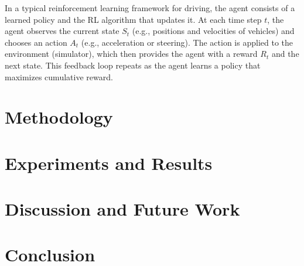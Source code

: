 \documentclass[12pt,a4paper]{article}
\begin{document}
In a typical reinforcement learning framework for driving, the agent consists of a learned policy and the RL algorithm that updates it. At each time step $t$, the agent observes the current state $S_t$ (e.g., positions and velocities of vehicles) and chooses an action $A_t$ (e.g., acceleration or steering). The action is applied to the environment (simulator), which then provides the agent with a reward $R_t$ and the next state. This feedback loop repeats as the agent learns a policy that maximizes cumulative reward.

\section{Methodology}

\section{Experiments and Results}

\section{Discussion and Future Work}


\section{Conclusion}




\end{document}
